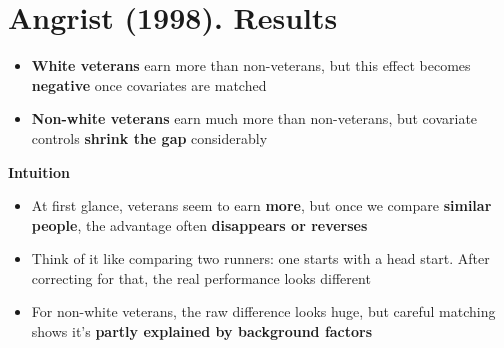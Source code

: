\documentclass[12pt]{article}
\begin{document}
\section*{\noindent\textbf{Angrist (1998). Results}}

\begin{itemize}
    \item \textbf{White veterans} earn more than non-veterans, but this effect becomes \textbf{negative} once covariates are matched
    \item \textbf{Non-white veterans} earn much more than non-veterans, but covariate controls \textbf{shrink the gap} considerably
\end{itemize}

\textbf{Intuition}
\begin{itemize}
    \item At first glance, veterans seem to earn \textbf{more}, but once we compare \textbf{similar people}, the advantage often \textbf{disappears or reverses}
    \item Think of it like comparing two runners: one starts with a head start. After correcting for that, the real performance looks different
    \item For non-white veterans, the raw difference looks huge, but careful matching shows it’s \textbf{partly explained by background factors}
\end{itemize}
\end{document}
